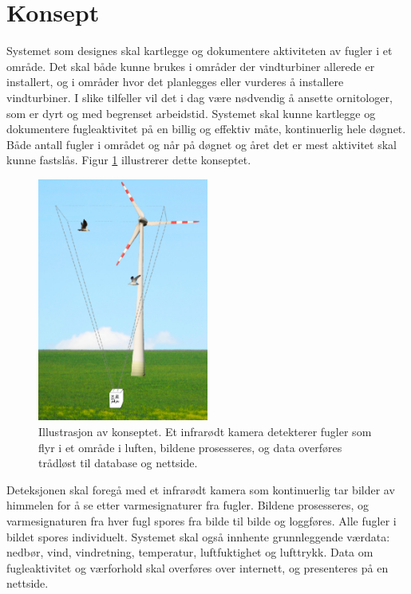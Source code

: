 \section{Konsept}
\label{sec:konsept}

Systemet som designes skal kartlegge og dokumentere aktiviteten av fugler i et område. 
Det skal både kunne brukes i områder der vindturbiner allerede er installert, og i områder hvor det planlegges eller vurderes å installere vindturbiner. 
I slike tilfeller vil det i dag være nødvendig å ansette ornitologer, som er dyrt og med begrenset arbeidstid. 
Systemet skal kunne kartlegge og dokumentere fugleaktivitet på en billig og effektiv måte, kontinuerlig hele døgnet. 
Både antall fugler i området og når på døgnet og året det er mest aktivitet skal kunne fastslås. Figur \ref{fig:konsept} illustrerer dette konseptet.



\begin{figure}[H]
    \centering
    \includegraphics[width=0.5\textwidth]{konsept/KonseptBilde.png}
    \caption{Illustrasjon av konseptet. Et infrarødt kamera detekterer fugler som flyr i et område i luften, bildene prosesseres, og data overføres trådløst til database og nettside.}
    \label{fig:konsept}
\end{figure}


Deteksjonen skal foregå med et infrarødt kamera som kontinuerlig tar bilder av himmelen for å se etter varmesignaturer fra fugler. Bildene prosesseres, og varmesignaturen fra hver fugl spores fra bilde til bilde og loggføres. Alle fugler i bildet spores individuelt. Systemet skal også innhente grunnleggende værdata: nedbør, vind, vindretning, temperatur, luftfuktighet og lufttrykk. Data om fugleaktivitet og værforhold skal overføres over internett, og presenteres på en nettside.






